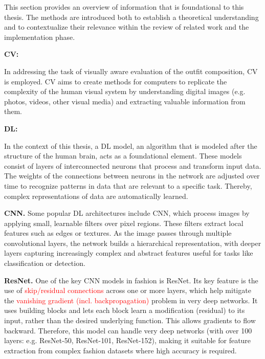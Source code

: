 This section provides an overview of information that is foundational to this thesis. The methods are introduced both to establish a theoretical understanding and to contextualize their relevance within the review of related work and the implementation phase.

\vspace{0.5cm}

\textbf{\ac{CV}:}

\vspace{0.5cm}

In addressing the task of visually aware evaluation of the outfit composition, \acs{CV} is employed. \acs{CV} aims to create methods for computers to replicate the complexity of the human visual system by understanding digital images (e.g. photos, videos, other visual media) and extracting valuable information from them. \cite[cf.]{brownlee_deep_2019}

\vspace{0.5cm}

\textbf{\ac{DL}:}

\vspace{0.5cm}

In the context of this thesis, a \acs{DL} model, an algorithm that is modeled after the structure of the human brain, acts as a foundational element. These models consist of layers of interconnected neurons that process and transform input data. The weights of the connections between neurons in the network are adjusted over time to recognize patterns in data that are relevant to a specific task. Thereby, complex representations of data are automatically learned. \cite[cf.]{muller_introduction_2017}

\vspace{0.5cm}

\textbf{\ac{CNN}.}
Some popular \acs{DL} architectures include \acs{CNN}, which process images by applying small, learnable filters over pixel regions. These filters extract local features such as edges or textures. As the image passes through multiple convolutional layers, the network builds a hierarchical representation, with deeper layers capturing increasingly complex and abstract features useful for tasks like classification or detection.

\vspace{0.5cm}

\textbf{\ac{ResNet}.}
One of the key \acs{CNN} models in fashion is \acs{ResNet}. Its key feature is the use of \textcolor{red}{skip/residual connections} across one or more layers, which help mitigate the \textcolor{red}{vanishing gradient (incl. backpropagation)} problem in very deep networks. It uses building blocks and lets each block learn a modification (residual) to its input, rather than the desired underlying function. This allows gradients to flow backward. Therefore, this model can handle very deep networks (with over 100 layers: e.g. ResNet-50, ResNet-101, ResNet-152), making it suitable for feature extraction from complex fashion datasets where high accuracy is required. \cite[cf.]{he_deep_2015}

